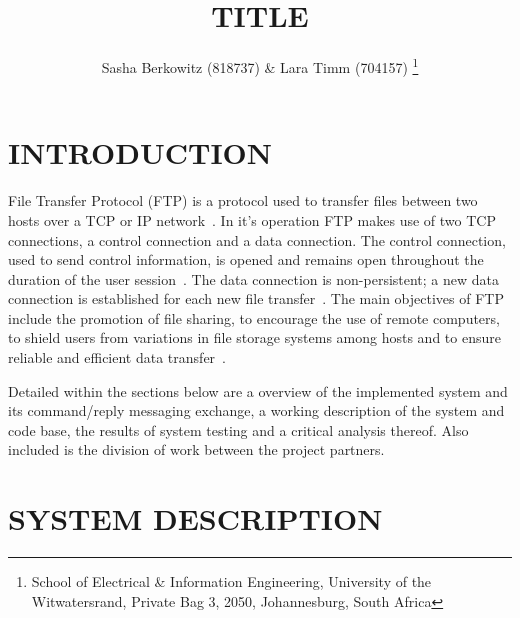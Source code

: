 \documentclass[10pt,twocolumn]{witseiepaper}
\begin{document}
\title{TITLE}

\author{Sasha Berkowitz (818737) \& Lara Timm (704157)
\thanks{School of Electrical \& Information Engineering, University of the
Witwatersrand, Private Bag 3, 2050, Johannesburg, South Africa}
}


%
\abstract{}

\keywords{}

\maketitle
\pagestyle{plain}
\setcounter{page}{1}


\section{INTRODUCTION}

File Transfer Protocol (FTP) is a protocol used  to transfer files between two hosts over a TCP or IP network~\cite{FTPbeginners}. In it's operation FTP makes use of two TCP connections, a control connection and a data connection. The control connection, used to send control information, is opened and remains open throughout the duration of the user session~\cite{topDownApproach6th}. The data connection is non-persistent; a new data connection is established for each new file transfer~\cite{topDownApproach6th}. The main objectives of FTP include the promotion of file sharing, to encourage the use of remote computers, to shield users from variations in file storage systems among hosts and to ensure reliable and efficient data transfer~\cite{rfc959}. 


Detailed within the sections below are a overview of the implemented system and its command/reply messaging exchange, a working description of the system and code base, the results of system testing and a critical analysis thereof. Also included is the division of work between the project partners.

\section{SYSTEM DESCRIPTION} 
\end{document}
